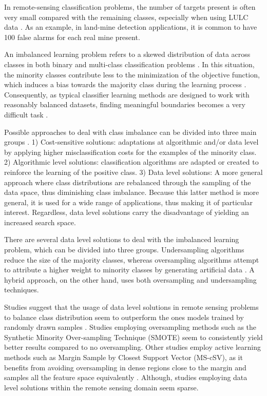 \documentclass[parskip=full]{scrartcl}
\begin{document}
In remote-sensing classification problems, the number of targets present is
often very small compared with the remaining classes, especially when using LULC
data \cite{Williams2009, Cenggoro2018}. As an example, in land-mine detection
applications, it is common to have 100 false alarms for each real mine present.

An imbalanced learning problem refers to a skewed distribution of data across
classes in both binary and multi-class classification problems \cite{Abdi2016}.
In this situation, the minority classes contribute less to the minimization of
the objective function, which induces a bias towards the majority class during
the learning process \cite{Douzas2019}. Consequently, as typical classifier
learning methods are designed to work with reasonably balanced datasets, finding
meaningful boundaries becomes a very difficult task \cite{Saez2016}.

Possible approaches to deal with class imbalance can be divided into three main
groups \cite{Fernandez2013}. 1) Cost-sensitive solutions: adaptations at
algorithmic and/or data level by applying higher misclassification costs for the
examples of the minority class. 2) Algorithmic level solutions: classification
algorithms are adapted or created to reinforce the learning of the positive
class. 3) Data level solutions: A more general approach where class
distributions are rebalanced through the sampling of the data space, thus
diminishing class imbalance. Because this latter method is more general, it is
used for a wide range of applications, thus making it of particular interest.
Regardless, data level solutions carry the disadvantage of yielding an increased
search space. %

There are several data level solutions to deal with the imbalanced learning
problem, which can be divided into three groups. Undersampling algorithms reduce
the size of the majority classes, whereas oversampling algorithms attempt to
attribute a higher weight to minority classes by generating artificial data
\cite{Mellor2015}. A hybrid approach, on the other hand, uses both oversampling
and undersampling techniques.

Studies suggest that the usage of data level solutions in remote sensing
problems to balance class distribution seem to outperform the ones models
trained by randomly drawn samples \cite{Wang2019, Mellor2015}.  Studies
employing oversampling methods such as the Synthetic Minority Over-sampling
Technique (SMOTE) \cite{Chawla2002} seem to consistently yield better results
\cite{Johnson2013, Geib2015} compared to no oversampling. Other studies employ
active learning methods such as Margin Sample by Closest Support Vector
(MS-cSV), as it benefits from avoiding oversampling in dense regions close to
the margin and samples all the feature space equivalently \cite{Tuia2009}.
Although, studies employing data level solutions within the remote sensing
domain seem sparse.
\end{document}

